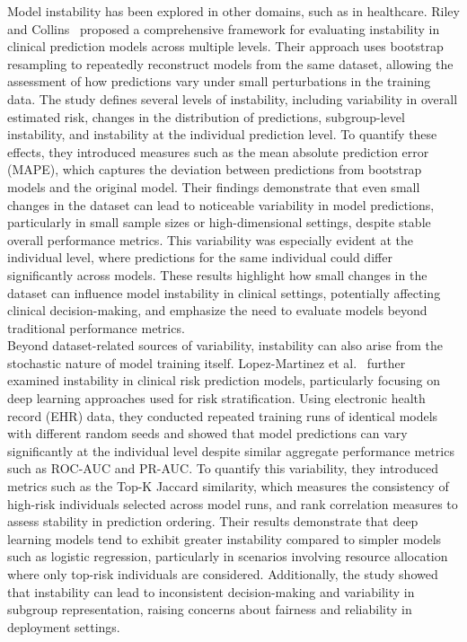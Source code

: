 \documentclass[12pt]{article}
\begin{document}
Model instability has been explored in other domains, such as in healthcare. Riley and Collins~\cite{riley2023stability} proposed a comprehensive framework for evaluating instability in clinical prediction models across multiple levels. Their approach uses bootstrap resampling to repeatedly reconstruct models from the same dataset, allowing the assessment of how predictions vary under small perturbations in the training data. The study defines several levels of instability, including variability in overall estimated risk, changes in the distribution of predictions, subgroup-level instability, and instability at the individual prediction level. To quantify these effects, they introduced measures such as the mean absolute prediction error (MAPE), which captures the deviation between predictions from bootstrap models and the original model. Their findings demonstrate that even small changes in the dataset can lead to noticeable variability in model predictions, particularly in small sample sizes or high-dimensional settings, despite stable overall performance metrics. This variability was especially evident at the individual level, where predictions for the same individual could differ significantly across models. These results highlight how small changes in the dataset can influence model instability in clinical settings, potentially affecting clinical decision-making, and emphasize the need to evaluate models beyond traditional performance metrics. \\

Beyond dataset-related sources of variability, instability can also arise from the stochastic nature of model training itself. Lopez-Martinez et al.~\cite{lopez2022instability} further examined instability in clinical risk prediction models, particularly focusing on deep learning approaches used for risk stratification. Using electronic health record (EHR) data, they conducted repeated training runs of identical models with different random seeds and showed that model predictions can vary significantly at the individual level despite similar aggregate performance metrics such as ROC-AUC and PR-AUC. To quantify this variability, they introduced metrics such as the Top-K Jaccard similarity, which measures the consistency of high-risk individuals selected across model runs, and rank correlation measures to assess stability in prediction ordering. Their results demonstrate that deep learning models tend to exhibit greater instability compared to simpler models such as logistic regression, particularly in scenarios involving resource allocation where only top-risk individuals are considered. Additionally, the study showed that instability can lead to inconsistent decision-making and variability in subgroup representation, raising concerns about fairness and reliability in deployment settings.\\
\end{document}
